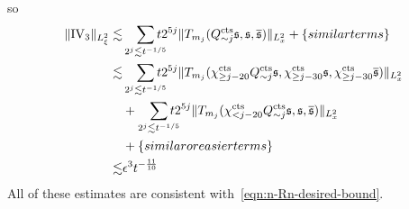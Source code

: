 \documentclass[letterpaper, reqno,final]{amsart}
\newcommand{\fs}{\mathfrak{s}}
\newcommand{\rmIV}{\mathrm{IV}}
\newcommand{\tcts}{\text{cts}}
\newcommand{\btext}[1]{\left\{\textup{#1}\right\}}
\newcommand{\bsim}{\btext{similar terms}}
\newcommand{\bsime}{\btext{similar or easier terms}}
\begin{document}
so
\begin{equation*}\begin{split}
    \lVert \rmIV_3 \rVert_{L^2_\xi} \lesssim& \smashoperator[r]{\sum_{2^j \lesssim t^{-1/5}}} t2^{5j} \lVert T_{m_j}(Q_{\sim j}^\tcts\fs, \fs, \overline{\fs}) \rVert_{L^2_x} + \bsim\\
    \lesssim& \smashoperator[r]{\sum_{2^j \lesssim t^{-1/5}}} t2^{5j} \lVert T_{m_j}(\chi_{\geq j - 20}^\tcts Q_{\sim j}^\tcts\fs, \chi_{\geq j - 30}^\tcts \fs, \chi_{\geq j - 30}^\tcts \overline{\fs}) \rVert_{L^2_x}\\
    &+ \smashoperator[r]{\sum_{2^j \lesssim t^{-1/5}}} t2^{5j} \lVert T_{m_j}(\chi_{< j - 20}^\tcts Q_{\sim j}^\tcts\fs,  \fs,  \overline{\fs}) \rVert_{L^2_x}\\
    &+ \bsime\\
    \lesssim& \epsilon^3 t^{-\frac{11}{10}}
\end{split}\end{equation*}
All of these estimates are consistent with~\eqref{eqn:n-Rn-desired-bound}.
\end{document}
